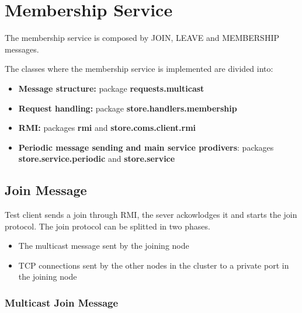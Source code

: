 \section{Membership Service}

The membership service is composed by JOIN, LEAVE and MEMBERSHIP messages. 

The classes where the membership service is implemented are divided into:

\begin{itemize}
    \item \textbf{Message structure:} package \textbf{requests.multicast}
    \item \textbf{Request handling:} package \textbf{store.handlers.membership}
    \item \textbf{RMI:} packages \textbf{rmi} and \textbf{store.coms.client.rmi}
    \item \textbf{Periodic message sending and main service prodivers}: packages \textbf{store.service.periodic} and \textbf{store.service}
\end{itemize}


\subsection{Join Message} 

Test client sends a join through RMI, the sever ackowlodges it and starts the join protocol.
The join protocol can be splitted in two phases.
\begin{itemize}
    \item The multicast message sent by the joining node
    \item TCP connections sent by the other nodes in the cluster to a private port in the joining node
\end{itemize}


\subsubsection{Multicast Join Message} 


